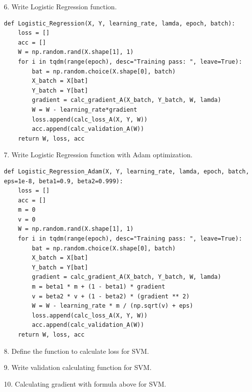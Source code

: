 \documentclass[journal, a4paper]{IEEEtran}
\begin{document}
6. Write Logistic Regression function.\par
\begin{lstlisting}
def Logistic_Regression(X, Y, learning_rate, lamda, epoch, batch):
    loss = []
    acc = []
    W = np.random.rand(X.shape[1], 1)
    for i in tqdm(range(epoch), desc="Training pass: ", leave=True):
        bat = np.random.choice(X.shape[0], batch)
        X_batch = X[bat]
        Y_batch = Y[bat]
        gradient = calc_gradient_A(X_batch, Y_batch, W, lamda)
        W = W - learning_rate*gradient
        loss.append(calc_loss_A(X, Y, W))
        acc.append(calc_validation_A(W))
    return W, loss, acc
\end{lstlisting}\par
7. Write Logistic Regression function with Adam optimization.\par
\begin{lstlisting}
def Logistic_Regression_Adam(X, Y, learning_rate, lamda, epoch, batch, eps=1e-8, beta1=0.9, beta2=0.999):
    loss = []
    acc = []
    m = 0
    v = 0
    W = np.random.rand(X.shape[1], 1)
    for i in tqdm(range(epoch), desc="Training pass: ", leave=True):
        bat = np.random.choice(X.shape[0], batch)
        X_batch = X[bat]
        Y_batch = Y[bat]
        gradient = calc_gradient_A(X_batch, Y_batch, W, lamda)
        m = beta1 * m + (1 - beta1) * gradient
        v = beta2 * v + (1 - beta2) * (gradient ** 2)
        W = W - learning_rate * m / (np.sqrt(v) + eps)
        loss.append(calc_loss_A(X, Y, W))
        acc.append(calc_validation_A(W))
    return W, loss, acc
\end{lstlisting}\par
8. Define the function to calculate loss for SVM.\par

9. Write validation calculating function for SVM.\par

10. Calculating gradient with formula above for SVM.\par
\end{document}

